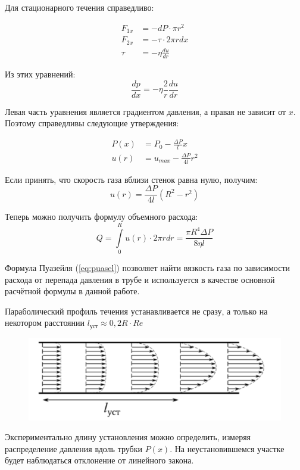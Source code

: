 \documentclass[12pt]{article}
\begin{document}
 Для стационарного течения справедливо:
 
 \begin{align*}
 	F_{1x} &= -dP\cdot \pi r^2 \\
 	F_{2x} &= -\tau \cdot 2\pi r dx\\
 	\tau &= -\eta \frac{du}{dr}
 \end{align*}
 
 Из этих уравнений:
 \begin{equation}
	\frac{dp}{dx} = -\eta \frac{2}{r} \frac{du}{dr}
 \end{equation}
 
 Левая часть уравнения является градиентом давления, а правая не зависит от $x$. Поэтому справедливы следующие утверждения:
 
 \begin{align}
 	P(x) &= P_0 - \frac{\Delta P}{l}x \\
 	u(r) &= u_{max} - \frac{\Delta P}{4l}r^2
 \end{align}
 
 Если принять, что скорость газа вблизи стенок равна нулю, получим:
 \[
 	u(r) = \frac{\Delta P}{4l}(R^2 - r^2)
 \]
 
 Теперь можно получить формулу объемного расхода:
 \begin{equation}
 	Q = \int\limits_{0}^R u(r)\cdot 2\pi rdr = \frac{\pi R^4\Delta P}{8\eta l}
 	\label{eq:puasel}
 \end{equation}
 
 Формула Пуазейля (\ref{eq:puasel}) позволяет найти вязкость газа по зависимости расхода от перепада  давления в трубе и используется в качестве основной расчётной формулы в данной работе.
 
 Параболический профиль течения устанавливается не сразу, а только на некотором расстоянии $l_{\text{уст}} \approx 0,2R\cdot Re$
  \begin{figure}[H]
 	\centering
 	\includegraphics[scale = 0.2]{./images/lust.png}
 	\label{fig:lust}
 \end{figure}

Экспериментально длину установления можно определить, измеряя распределение давления вдоль трубки $P(x)$. На неустановившемся участке будет наблюдаться отклонение от линейного закона.
\end{document}
